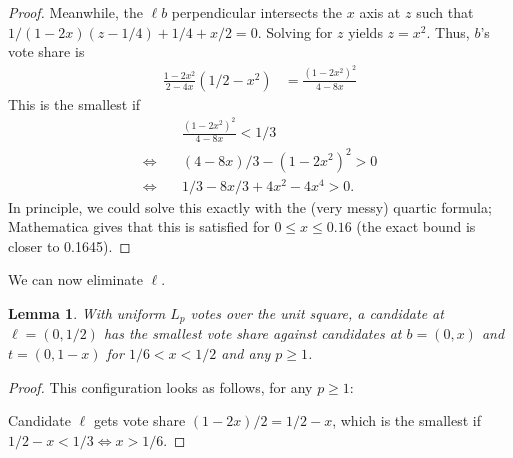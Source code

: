 \documentclass{article}
\theoremstyle{theorem}
\newtheorem{lemma}{Lemma}
\theoremstyle{definition}
\begin{document}
\begin{proof}
 Meanwhile, the $\ell b$ perpendicular intersects the $x$ axis at $z$ such that $1/(1-2x)(z - 1/4) + 1/4 + x/2 = 0$. Solving for $z$ yields $z = x^2$. Thus, $b$'s vote share is 
\begin{align*}
  \frac{1 - 2 x^2}{2 - 4 x}(1/2 - x^2) &= \frac{(1 - 2 x^2)^2}{4 - 8 x}
\end{align*}
This is the smallest if 
\begin{align*}
  &\frac{(1 - 2 x^2)^2}{4 - 8 x}< 1/3 \\
  \Leftrightarrow \quad &  ( 4 - 8 x)/3 - (1 - 2 x^2)^2 > 0\\
  \Leftrightarrow \quad & 1/3 - 8 x/3 + 4 x^2 - 4 x^4 > 0.
\end{align*}
In principle, we could solve this exactly with the (very messy) quartic formula; Mathematica gives that this is satisfied for $0 \le x \le 0.16$ (the exact bound is closer to 0.1645). 
\end{proof}

We can now eliminate $\ell$.


\begin{lemma}\label{lemma:square-step3}
    With uniform $L_p$ votes over the unit square, a candidate at $\ell = (0, 1/2)$ has the smallest vote share against candidates at $b = (0, x)$ and $t = (0, 1-x)$ for $1/6 < x < 1/2$ and any $p\ge 1$. 
\end{lemma}
\begin{proof}
This configuration looks as follows, for any $p \ge 1$:
    \begin{center}
\end{center}
Candidate $\ell$ gets vote share $(1-2x)/2 = 1/2 - x$, which is the smallest if $1/2 - x < 1/3 \Leftrightarrow x > 1/6.$

\end{proof}
\end{document}
